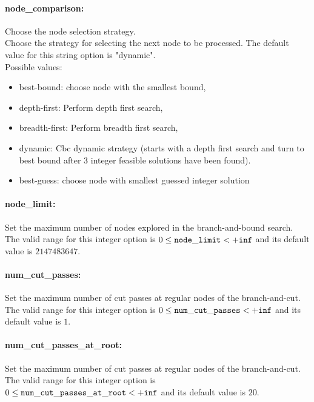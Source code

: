 \paragraph{node\_comparison:} Choose the node selection strategy. $\;$ \\
 Choose the strategy for selecting the next node
to be processed.
The default value for this string option is "dynamic".
\\ 
Possible values:
\begin{itemize}
   \item best-bound: choose node with the smallest bound,
   \item depth-first: Perform depth first search,
   \item breadth-first: Perform breadth first search,
   \item dynamic: Cbc dynamic strategy (starts with a depth first
search and turn to best bound after 3 integer
feasible solutions have been found).
   \item best-guess: choose node with smallest guessed integer
solution
\end{itemize}

\paragraph{node\_limit:} Set the maximum number of nodes explored in the branch-and-bound search. $\;$ \\
 The valid range for this integer option is
$0 \le {\tt node\_limit } <  {\tt +inf}$
and its default value is $2147483647$.


\paragraph{num\_cut\_passes:} Set the maximum number of cut passes at regular nodes of the branch-and-cut. $\;$ \\
 The valid range for this integer option is
$0 \le {\tt num\_cut\_passes } <  {\tt +inf}$
and its default value is $1$.


\paragraph{num\_cut\_passes\_at\_root:} Set the maximum number of cut passes at regular nodes of the branch-and-cut. $\;$ \\
 The valid range for this integer option is
$0 \le {\tt num\_cut\_passes\_at\_root } <  {\tt +inf}$
and its default value is $20$.


